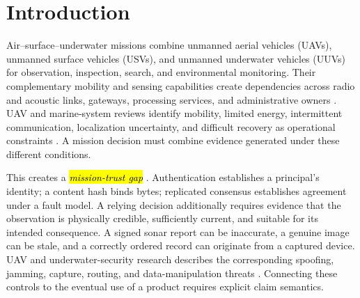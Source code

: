 \documentclass[blockchains,review,accept,moreauthors]{Definitions/mdpi}
\begin{document}
%
%
%
%
%
%
%
%
%
%
%



\section{Introduction}

Air--surface--underwater missions combine unmanned aerial vehicles (UAVs), unmanned surface vehicles (USVs), and unmanned underwater vehicles (UUVs) for observation, inspection, search, and environmental monitoring. Their complementary mobility and sensing capabilities create dependencies across radio and acoustic links, gateways, processing services, and administrative owners \citep{li2023survey,wei20233u,pang2026cooperative}. UAV and marine-system reviews identify mobility, limited energy, intermittent communication, localization uncertainty, and difficult recovery as operational constraints \citep{hayat2016survey,shakhatreh2019unmanned,bae2023survey,gonzlezgarca2020autonomous}. A mission decision must combine evidence generated under these different conditions.

This creates a \emph{\hl{mission-trust gap}%
}. Authentication establishes a principal's identity; a content hash binds bytes; replicated consensus establishes agreement under a fault model. A relying decision additionally requires evidence that the observation is physically credible, sufficiently current, and suitable for its intended consequence. A signed sonar report can be inaccurate, a genuine image can be stale, and a correctly ordered record can originate from a captured device. UAV and underwater-security research describes the corresponding spoofing, jamming, capture, routing, and data-manipulation threats \citep{mekdad2023survey,wang2025survey,hadi2023comprehensive,jiang2019securing,yisa2021security}. Connecting these controls to the eventual use of a product requires explicit claim semantics.
\end{document}
